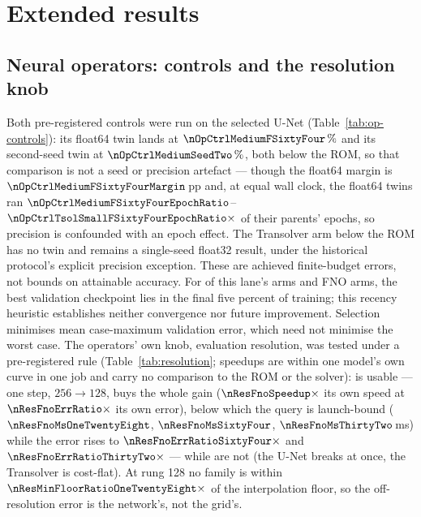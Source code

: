 \section{Extended results}
\label{app:extended}

\subsection{Neural operators: controls and the resolution knob}
\label{app:extended:operators}
Both pre-registered controls were run on the selected U-Net
(Table~\ref{tab:op-controls}): its float64 twin lands at
$\nOpCtrlMediumFSixtyFour\,\%$ and its second-seed twin at
$\nOpCtrlMediumSeedTwo\,\%$, both below the ROM, so that comparison is not
a seed or precision artefact --- though the float64 margin is
$\nOpCtrlMediumFSixtyFourMargin$\,pp and, at equal wall clock, the float64
twins ran
$\nOpCtrlMediumFSixtyFourEpochRatio$--$\nOpCtrlTsolSmallFSixtyFourEpochRatio\times$
of their parents' epochs, so precision is confounded with an epoch effect.
The Transolver arm below the ROM has no twin and remains a single-seed
float32 result, under the historical protocol's explicit precision exception.
These are achieved finite-budget errors, not bounds on attainable accuracy.
For \nOpLaneImproving{} of this lane's arms and \nOpFnoImproving{} FNO arms,
the best validation checkpoint lies in the final five percent of training;
this recency heuristic establishes neither convergence nor future improvement.
Selection minimises mean case-maximum validation error, which need not
minimise the worst case. The operators' own knob,
evaluation resolution, was tested under a pre-registered rule
(Table~\ref{tab:resolution}; speedups are within one model's own curve in
one job and carry no comparison to the ROM or the solver):
\nResUsableList{} is usable --- one step, $256\to128$, buys the whole gain
($\nResFnoSpeedup\times$ its own speed at $\nResFnoErrRatio\times$ its own
error), below which the query is launch-bound
($\nResFnoMsOneTwentyEight$, $\nResFnoMsSixtyFour$,
$\nResFnoMsThirtyTwo$\,ms) while the error rises to
$\nResFnoErrRatioSixtyFour\times$ and $\nResFnoErrRatioThirtyTwo\times$
--- while \nResDegenerateList{} are not (the U-Net breaks at once, the
Transolver is cost-flat). At rung 128 no family is within
$\nResMinFloorRatioOneTwentyEight\times$ of the interpolation floor, so the
off-resolution error is the network's, not the grid's.

